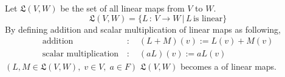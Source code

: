 \documentclass[a4paper, 10pt]{article}
\begin{document}

\begin{definition}
    Let $\mathfrak{L}(V,W)$ be the set of all linear maps from $V$ to $W$.
    \[ \mathfrak{L}(V,W) = \{ L \,:\, V \rightarrow W \,|\, L \, \text{is linear} \} \]
    By defining addition and scalar multiplication of linear maps as following,
    \begin{align*}
        \text{addition} \,&: \quad (L+M)(v) := L(v) + M(v) \\
        \text{scalar multiplication} \,&: \quad (aL)(v) := aL(v)
    \end{align*}
    $(L, M \in \mathfrak{L}(V, W),\; v \in V,\; a \in F)$ $\mathfrak{L}(V,W)$ becomes a  of linear maps.
\end{definition}

\seprule
\end{document}
